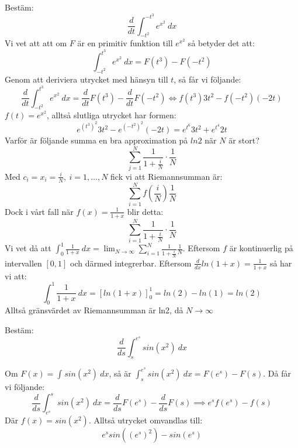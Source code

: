 \documentclass{report}
\begin{document}
\ex{}
{
Bestäm:
\begin{equation*}
	\frac{d}{dt} \int_{-t^2}^{-t^3} e^{x^2} \: dx 
\end{equation*}
Vi vet att att om $ F $ är en primitiv funktion till $ e^{x^2} $ så betyder det att:
\begin{equation*}
	\int_{-t^2}^{t^3} e^{x^2} \: dx = F(t^3) - F(-t^2) 
\end{equation*}
Genom att deriviera utrycket med hänsyn till $ t $, så får vi följande:
\begin{equation*}
	\frac{d}{dt} \int_{-t^2}^{t^3} e^{x^2} \: dx = \frac{d}{dt} F(t^3) - \frac{d}{dt} F(-t^2) \iff f(t^3) 3t^2 - f(-t^2) (-2t) 
\end{equation*}
$ f(t) = e^{x^2} $, alltså slutliga utrycket har formen:
\begin{equation*}
	e^{(t^3)^2}3t^2 - e^{(-t^2)^2}(-2t) = e^{t^6} 3t^2 + e^{t^4} 2t
\end{equation*}
}
\ex{}
{
Varför är följande summa en bra approximation på $ ln2 $ när $ N $ är stort?
\begin{equation*}
\sum_{j = 1}^{N} \frac{1}{1 + \frac{i}{N} } \cdot \frac{1}{N} 
\end{equation*}
Med $ c_i = x_i = \frac{i}{N},\: i = 1, \ldots , N $ fick vi att Riemannsumman är:
\begin{equation*}
\sum_{i = 1}^{N} f( \frac{i}{N} ) \frac{1}{N} 
\end{equation*}
Dock i vårt fall när $ f(x) = \frac{1}{1+x}  $ blir detta:
\begin{equation*}
\sum_{i = 1}^{N} \frac{1}{1 + \frac{i}{N} } \cdot \frac{1}{N} 
\end{equation*}
Vi vet då att $ \int_{0}^{1} \frac{1}{1+x}  \: dx = \lim_{N \to \infty} \sum_{i = 1}^{N} \frac{1}{1 + \frac{i}{N} } \frac{1}{N}  $. Eftersom $ f $ är kontinuerlig på intervallen $ [0,1] $ och därmed integrerbar. Eftersom $ \frac{d}{dx}ln(1+x) = \frac{1}{1+x}  $ så har vi att:
\begin{equation*}
	\int_{0}^{1} \frac{1}{1+x}  \: dx = [ln(1+x)]_{0}^{1} = ln(2) - ln(1) = ln(2) 
\end{equation*}
Alltså gränsvärdet av Riemannsumman är ln2, då $ N \to \infty $ 
}

\qs{}
{
Bestäm:
\begin{equation*}
\frac{d}{ds} \int_{s}^{e^s} sin(x^2) \: dx 
\end{equation*}
}

\sol Om $ F(x) = \int_{}^{} sin(x^2) \: dx  $, så är $ \int_{s}^{e^s} sin(x^2) \: dx = F(e^s) - F(s)  $. Då får vi följande:
\begin{equation*}
\frac{d}{ds} \int_{e^s}^{s} sin(x^2) \: dx = \frac{d}{ds} F(e^s) - \frac{d}{ds} F(s) \implies  e^s f(e^s) - f(s)
\end{equation*}
Där $ f(x) = sin(x^2) $. Alltså utrycket omvandlas till:
\begin{equation*}
	e^s sin((e^s)^2) - sin(e^s)
\end{equation*}
\end{document}
